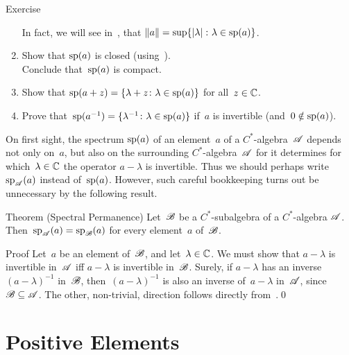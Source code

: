 \documentclass[a]{subfiles}
\begin{document}
\begin{parsec}
\begin{point}{Exercise}
\begin{enumerate}
In fact, we will see in~,
that $\|a\|=\sup\{\left|\lambda\right|\colon \lambda\in \mathrm{sp}(a)\}$.
\item
Show that $\mathrm{sp}(a)$ is closed (using~).\\
Conclude that~$\mathrm{sp}(a)$ is compact.
\item
Show that $\mathrm{sp}(a+z)=\{\lambda+z\colon \lambda\in\mathrm{sp}(a)\}$
for all~$z\in \mathbb{C}$.
\item
Prove that~$\mathrm{sp}(a^{-1})=\{\lambda^{-1}\colon \lambda\in \mathrm{sp}(a)\}$
if~$a$ is invertible (and~$0\notin \mathrm{sp}(a)$).
\end{enumerate}
\end{point}
\begin{point}%
On first sight,
the spectrum $\mathrm{sp}(a)$
of an element~$a$ of a $C^*$-algebra~$\mathscr{A}$ 
depends not only on~$a$,
but also on the surrounding $C^*$-algebra~$\mathscr{A}$ for it determines
for which~$\lambda\in\mathbb{C}$ the operator $a-\lambda$ is invertible.
Thus we should perhaps write $\mathrm{sp}_{\mathscr{A}}(a)$ instead
of~$\mathrm{sp}(a)$.
However, such careful bookkeeping turns out 
be unnecessary
by the following result.
\end{point}
\begin{point}{Theorem (Spectral Permanence)}%
%
Let~$\mathscr{B}$ be a $C^*$-subalgebra of a $C^*$-algebra $\mathscr{A}$.
Then~$\mathrm{sp}_{\mathscr{A}}(a)=\mathrm{sp}_{\mathscr{B}}(a)$
for every element~$a$ of~$\mathscr{B}$.
\begin{point}{Proof}%
Let~$a$ be an element of~$\mathscr{B}$,
and let~$\lambda\in \mathbb{C}$.
We must show that $a-\lambda$ is invertible in~$\mathscr{A}$
iff $a-\lambda$ is invertible in~$\mathscr{B}$.
Surely,
if $a-\lambda$ has an inverse $(a-\lambda)^{-1}$ in~$\mathscr{B}$,
then~$(a-\lambda)^{-1}$ is also an inverse of~$a-\lambda$ in~$\mathscr{A}$,
since~$\mathscr{B}\subseteq \mathscr{A}$.
The other, non-trivial, direction follows
directly from~.\qed%
\end{point}
\end{point}
\end{parsec}
\section{Positive Elements}
\end{document}
